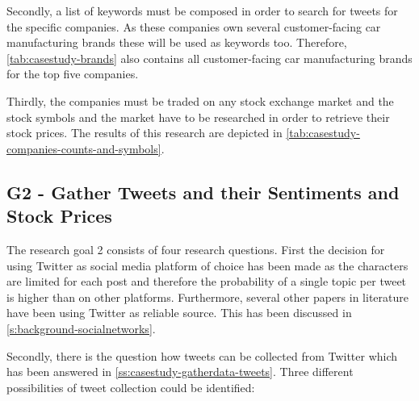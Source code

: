 Secondly, a list of keywords must be composed in order to search for tweets for the specific companies.
As these companies own several customer-facing car manufacturing brands these will be used as keywords too.
Therefore, \cref{tab:casestudy-brands} also contains all customer-facing car manufacturing brands for the top five companies.

Thirdly, the companies must be traded on any stock exchange market and the stock symbols and the market have to be researched in order to retrieve their stock prices.
The results of this research are depicted in \cref{tab:casestudy-companies-counts-and-symbols}.

\subsection{G2 - Gather Tweets and their Sentiments and Stock Prices}
\label{ss:conclusion-summary-g2}


The research goal 2 consists of four research questions.
First the decision for using Twitter as social media platform of choice has been made as the characters are limited for each post and therefore the probability of a single topic per tweet is higher than on other platforms.
Furthermore, several other papers in literature have been using Twitter as reliable source.
This has been discussed in \cref{s:background-socialnetworks}.

Secondly, there is the question how tweets can be collected from Twitter which has been answered in \cref{ss:casestudy-gatherdata-tweets}.
Three different possibilities of tweet collection could be identified:

